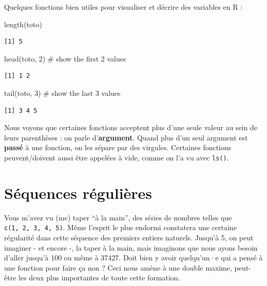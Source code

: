 \documentclass[
  letterpaper,
  DIV=11,
  numbers=noendperiod]{scrreprt}
\newenvironment{Shaded}{\begin{snugshade}}{\end{snugshade}}
\newcommand{\CommentTok}[1]{\textcolor[rgb]{0.37,0.37,0.37}{#1}}
\newcommand{\DecValTok}[1]{\textcolor[rgb]{0.68,0.00,0.00}{#1}}
\newcommand{\FunctionTok}[1]{\textcolor[rgb]{0.28,0.35,0.67}{#1}}
\newcommand{\NormalTok}[1]{\textcolor[rgb]{0.00,0.23,0.31}{#1}}
\begin{document}
Quelques fonctions bien utiles pour visualiser et décrire des variables
en R :

\begin{Shaded}
\begin{Highlighting}[]
\FunctionTok{length}\NormalTok{(toto) }
\end{Highlighting}
\end{Shaded}

\begin{verbatim}
[1] 5
\end{verbatim}

\begin{Shaded}
\begin{Highlighting}[]
\FunctionTok{head}\NormalTok{(toto, }\DecValTok{2}\NormalTok{) }\CommentTok{\# show the first 2 values}
\end{Highlighting}
\end{Shaded}

\begin{verbatim}
[1] 1 2
\end{verbatim}

\begin{Shaded}
\begin{Highlighting}[]
\FunctionTok{tail}\NormalTok{(toto, }\DecValTok{3}\NormalTok{) }\CommentTok{\# show the last 3 values}
\end{Highlighting}
\end{Shaded}

\begin{verbatim}
[1] 3 4 5
\end{verbatim}

Nous voyons que certaines fonctions acceptent plus d'une seule valeur au
sein de leurs parenthèses : on parle d'\textbf{argument}. Quand plus
d'un seul argument est \textbf{passé} à une fonction, on les sépare par
des virgules. Certaines fonctions peuvent/doivent aussi être appelées à
vide, comme on l'a vu avec \texttt{ls()}.

\hypertarget{suxe9quences-ruxe9guliuxe8res}{%
\section{Séquences régulières}\label{suxe9quences-ruxe9guliuxe8res}}

Vous m'avez vu (me) taper ``à la main'', des séries de nombres telles
que \texttt{c(1,\ 2,\ 3,\ 4,\ 5)}. Même l'esprit le plus endormi
constatera une certaine régularité dans cette séquence des premiers
entiers naturels. Jusqu'à 5, on peut imaginer - et encore -, la taper à
la main, mais imaginons que nous ayons besoin d'aller jusqu'à 100 ou
même à 37427. Doit bien y avoir quelqu'un·e qui a pensé à une fonction
pour faire ça non ? Ceci nous amène à une double maxime, peut-être les
deux plus importantes de toute cette formation.
\end{document}
